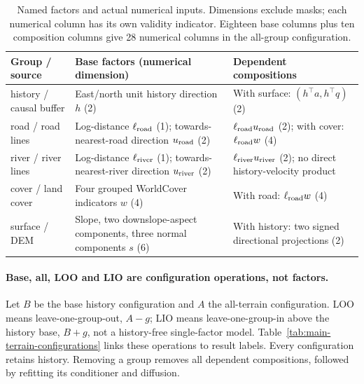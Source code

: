 \begin{table}[!htbp]\centering\small
\caption{Named factors and actual numerical inputs. Dimensions exclude masks;
each numerical column has its own validity indicator. Eighteen base columns
plus ten composition columns give 28 numerical columns in the all-group configuration.}
\label{tab:main-terrain-factors}
\begin{tabular}{@{}p{.17\linewidth}p{.43\linewidth}p{.32\linewidth}@{}}\toprule
Group / source & Base factors (numerical dimension) & Dependent compositions\\\midrule
history / causal buffer & East/north unit history direction $h$ (2) & With surface: $(h^\top a,h^\top q)$ (2)\\
road / road lines & Log-distance $\ell_{\rm road}$ (1); towards-nearest-road direction $u_{\rm road}$ (2) & $\ell_{\rm road}u_{\rm road}$ (2); with cover: $\ell_{\rm road}w$ (4)\\
river / river lines & Log-distance $\ell_{\rm river}$ (1); towards-nearest-river direction $u_{\rm river}$ (2) & $\ell_{\rm river}u_{\rm river}$ (2); no direct history-velocity product\\
cover / land cover & Four grouped WorldCover indicators $w$ (4) & With road: $\ell_{\rm road}w$ (4)\\
surface / DEM & Slope, two downslope-aspect components, three normal components $s$ (6) & With history: two signed directional projections (2)\\\bottomrule
\end{tabular}\end{table}

\paragraph{Base, all, LOO and LIO are configuration operations, not factors.}
Let $B$ be the base history configuration and $A$ the all-terrain configuration.
LOO means leave-one-group-out, $A-g$; LIO means leave-one-group-in above the
history base, $B+g$, not a history-free single-factor model.
Table~\ref{tab:main-terrain-configurations} links these operations to result labels.
Every configuration retains history. Removing a group removes all dependent
compositions, followed by refitting its conditioner and diffusion.

